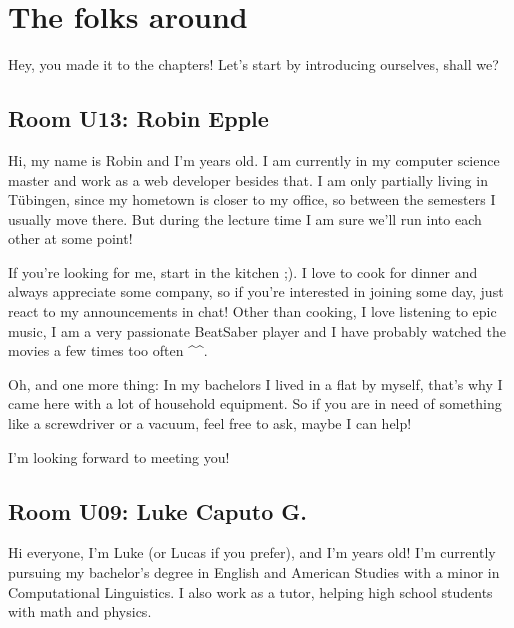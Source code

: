 \chapter{The folks around} \label{chap:introductions}
%
%
%

Hey, you made it to the chapters! Let's start by introducing ourselves, shall we?

\section{Room U13: Robin Epple} \label{sec:robinE}
%
\FPsub\result{\theCurrentDate}{\theBirthdate}
\FPdiv{}
\FPtrunc{}

Hi, my name is Robin and I'm \myage{} years old. I am currently in my computer science master and work as a web developer besides that. I am only partially living in Tübingen, since my hometown is closer to my office, so between the semesters I usually move there. But during the lecture time I am sure we'll run into each other at some point!

If you're looking for me, start in the kitchen ;). I love to cook for dinner and always appreciate some company, so if you're interested in joining some day, just react to my announcements in chat! Other than cooking, I love listening to epic music, I am a very passionate BeatSaber player and I have probably watched the  movies a few times too often \^{}\^{}.

Oh, and one more thing: In my bachelors I lived in a flat by myself, that's why I came here with a lot of household equipment. So if you are in need of something like a screwdriver or a vacuum, feel free to ask, maybe I can help!

I'm looking forward to meeting you!

\section{Room U09: Luke Caputo G.} \label{sec:lucasC}
%
\FPsub\result{\theCurrentDate}{\theBirthdate}
\FPdiv{}
\FPtrunc{}

Hi everyone, I’m Luke (or Lucas if you prefer), and I’m \myage{} years old! I’m currently pursuing my bachelor’s degree in English and American Studies with a minor in Computational Linguistics. I also work as a tutor, helping high school students with math and physics.  

